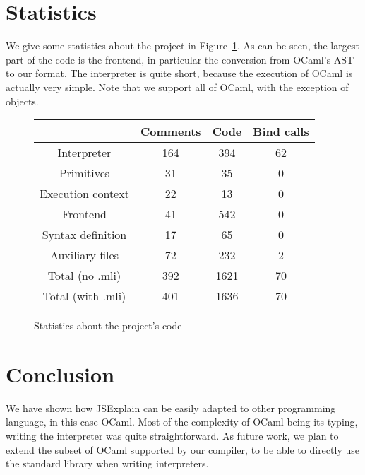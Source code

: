 \documentclass[twocolumn]{article}
\begin{document}
\section{Statistics}

We give some statistics about the project in Figure~\ref{fig:statistics}. As can
be seen, the largest part of the code is the frontend, in particular the
conversion from OCaml's AST to our format. The interpreter is quite short,
because the execution of OCaml is actually very simple. Note that we support all
of OCaml, with the exception of objects.

\begin{figure}[hb]
  \begin{tabular}{| c | c | c | c |}
    \hline
    & Comments & Code & Bind calls \\
    \hline
    Interpreter & 164 & 394 & 62 \\
    Primitives & 31 & 35 & 0 \\
    Execution context & 22 & 13 & 0 \\
    Frontend & 41 & 542 & 0 \\
    Syntax definition & 17 & 65 & 0 \\
    Auxiliary files & 72 & 232 & 2 \\
    \hline
    Total (no .mli) & 392 & 1621 & 70 \\
    Total (with .mli) & 401 & 1636 & 70 \\
    \hline
  \end{tabular}

  \centering
  \caption{Statistics about the project's code}
  \label{fig:statistics}
\end{figure}

\section{Conclusion}
We have shown how JSExplain can be easily adapted to other programming language,
in this case OCaml. Most of the complexity of OCaml being its typing, writing
the interpreter was quite straightforward. As future work, we plan to extend the
subset of OCaml supported by our compiler, to be able to directly use the
standard library when writing interpreters.



\end{document}
